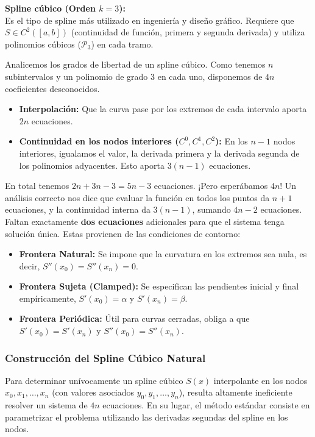 \textbf{Spline cúbico (Orden $k=3$):}\\
Es el tipo de spline más utilizado en ingeniería y diseño gráfico. Requiere que $S \in C^2([a,b])$ (continuidad de función, primera y segunda derivada) y utiliza polinomios cúbicos ($\mathcal{P}_3$) en cada tramo.

Analicemos los grados de libertad de un spline cúbico. Como tenemos $n$ subintervalos y un polinomio de grado 3 en cada uno, disponemos de $4n$ coeficientes desconocidos.
\begin{itemize}
    \item \textbf{Interpolación:} Que la curva pase por los extremos de cada intervalo aporta $2n$ ecuaciones.
    \item \textbf{Continuidad en los nodos interiores ($C^0, C^1, C^2$):} En los $n-1$ nodos interiores, igualamos el valor, la derivada primera y la derivada segunda de los polinomios adyacentes. Esto aporta $3(n-1)$ ecuaciones.
\end{itemize}
En total tenemos $2n + 3n - 3 = 5n - 3$ ecuaciones. ¡Pero esperábamos $4n$! Un análisis correcto nos dice que evaluar la función en todos los puntos da $n+1$ ecuaciones, y la continuidad interna da $3(n-1)$, sumando $4n-2$ ecuaciones. Faltan exactamente \textbf{dos ecuaciones} adicionales para que el sistema tenga solución única. Estas provienen de las condiciones de contorno:
\begin{itemize}
    \item \textbf{Frontera Natural:} Se impone que la curvatura en los extremos sea nula, es decir, $S''(x_0) = S''(x_n) = 0$.
    \item \textbf{Frontera Sujeta (Clamped):} Se especifican las pendientes inicial y final empíricamente, $S'(x_0) = \alpha$ y $S'(x_n) = \beta$.
    \item \textbf{Frontera Periódica:} Útil para curvas cerradas, obliga a que $S'(x_0) = S'(x_n)$ y $S''(x_0) = S''(x_n)$.
\end{itemize}

\subsubsection{Construcción del Spline Cúbico Natural}

Para determinar unívocamente un spline cúbico $S(x)$ interpolante en los nodos $x_0, x_1, \dots, x_n$ (con valores asociados $y_0, y_1, \dots, y_n$), resulta altamente ineficiente resolver un sistema de $4n$ ecuaciones. En su lugar, el método estándar consiste en parametrizar el problema utilizando las derivadas segundas del spline en los nodos. 

